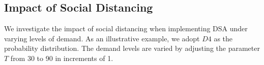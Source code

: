 



\subsection{Impact of Social Distancing}
We investigate the impact of social distancing when implementing DSA under varying levels of demand. 
As an illustrative example, we adopt $D4$ as the probability distribution. The demand levels are varied by adjusting the parameter $T$ from 30 to 90 in increments of 1.


